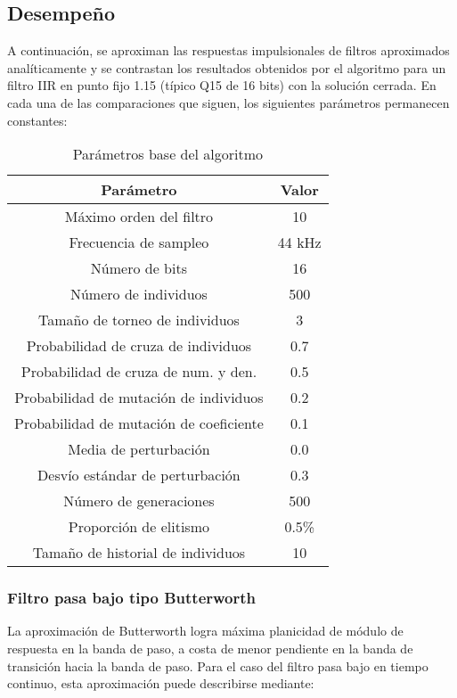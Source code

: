 \documentclass[11pt, journal]{IEEEtran}
\begin{document}
\subsection{Desempeño}

A continuación, se aproximan las respuestas impulsionales de filtros
aproximados analíticamente y se contrastan los resultados obtenidos por
el algoritmo para un filtro IIR en punto fijo 1.15 (típico Q15 de 16
bits) con la solución cerrada. En cada una de las comparaciones que
siguen, los siguientes parámetros permanecen constantes:

\begin{table}[ht]
  \centering
  \begin{tabular}{c||c}
    \hline
    Parámetro & Valor \\
    \hline
    Máximo orden del filtro & 10 \\
    Frecuencia de sampleo & 44 kHz \\
    Número de bits & 16 \\
    Número de individuos & 500 \\
    Tamaño de torneo de individuos & 3 \\
    Probabilidad de cruza de individuos & 0.7 \\
    Probabilidad de cruza de num. y den. & 0.5 \\
    Probabilidad de mutación de individuos & 0.2 \\
    Probabilidad de mutación de coeficiente & 0.1 \\
    Media de perturbación & 0.0 \\
    Desvío estándar de perturbación & 0.3 \\
    Número de generaciones & 500 \\
    Proporción de elitismo & 0.5\% \\
    Tamaño de historial de individuos & 10 \\
    \hline
  \end{tabular}
  \caption{Parámetros base del algoritmo}
\end{table}

\subsubsection{Filtro pasa bajo tipo Butterworth}

La aproximación de Butterworth logra máxima planicidad de módulo de
respuesta en la banda de paso, a costa de menor pendiente en la banda de
transición hacia la banda de paso. Para el caso del filtro pasa bajo en
tiempo continuo, esta aproximación puede describirse mediante:
\end{document}
